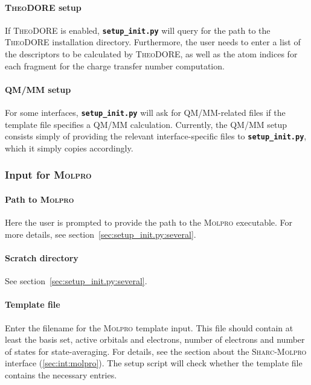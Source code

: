 \documentclass[a4paper,10pt,DIV=15,openany,twoside=false]{scrbook}
\newcommand{\sharc}{\textsc{Sharc}}
\newcommand{\ttt}[1]{\textbf{\texttt{#1}}}
\begin{document}
\paragraph{\textsc{TheoDORE} setup}

If \textsc{TheoDORE} is enabled, \ttt{setup\_init.py} will query for the path to the \textsc{TheoDORE} installation directory. Furthermore, the user needs to enter a list of the descriptors to be calculated by \textsc{TheoDORE}, as well as the atom indices for each fragment for the charge transfer number computation.

\paragraph{QM/MM setup}

For some interfaces, \ttt{setup\_init.py} will ask for QM/MM-related files if the template file specifies a QM/MM calculation.
Currently, the QM/MM setup consists simply of providing the relevant interface-specific files to \ttt{setup\_init.py}, which it simply copies accordingly.


\subsubsection{Input for \textsc{Molpro}}\label{sec:setup_init.py:molpro}

\paragraph{Path to \textsc{Molpro}}

Here the user is prompted to provide the path to the \textsc{Molpro} executable. 
For more details, see section~\ref{sec:setup_init.py:several}.

\paragraph{Scratch directory}

See section~\ref{sec:setup_init.py:several}.

\paragraph{Template file}

Enter the filename for the \textsc{Molpro} template input. This file should contain at least the basis set, active orbitals and electrons, number of electrons and number of states for state-averaging. For details, see the section about the \sharc-\textsc{Molpro} interface (\ref{sec:int:molpro}). The setup script will check whether the template file contains the necessary entries. 
\end{document}
